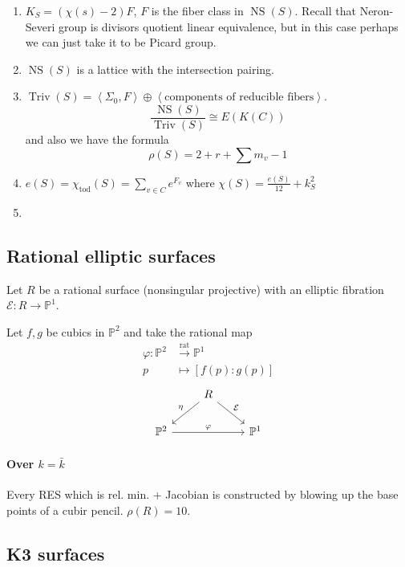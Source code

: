 \begin{enumerate}
	\item $K_S=(\chi(s)-2)F$,  $F$ is the fiber class in $\operatorname{NS}(S)$. Recall that Neron-Severi group is divisors quotient linear equivalence, but in this case perhaps we can just take it to be Picard group.
\item $\operatorname{NS}(S)$ is a lattice with the intersection pairing.
	\item $\operatorname{Triv}(S)=\left<\Sigma_0,F\right> \oplus \left<\text{components of reducible fibers} \right> $.
		\[\dfrac{\operatorname{NS}(S)}{\operatorname{Triv}(S)}\cong E(K(C))\]
		and also we have the formula
		\[\rho(S)=2+r+\sum m_v-1\]
	\item $e(S)=\chi_{\text{tod} }(S)=\sum_{v\in C}e^{F_v}$ where $\chi(S)=\frac{e(S)}{12}+k^2_S$
	\item 
\end{enumerate}

\subsection{Rational elliptic surfaces}

\begin{defn}
	Let $R$ be a rational surface (nonsingular projective) with an elliptic fibration $\mathcal{E}:R\to \mathbb{P}^1$.
\end{defn}

\begin{example}
	Let $f,g$ be cubics in  $\mathbb{P}^2$ and take the rational map
	\begin{align*}
		\varphi: \mathbb{P}^2 &\overset{\operatorname{rat}}{\longrightarrow} \mathbb{P}^1 \\
		p &\longmapsto [f(p):g(p)]
	\end{align*}
	\[\begin{tikzcd}
	&R\arrow[dl,"\eta",swap]\arrow[dr,"\mathcal{E}"]\\
	\mathbb{P}^2\arrow[rr,"\varphi"]&&\mathbb{P}^1
	\end{tikzcd}\]
\end{example}

\paragraph{Over $k=\bar{k}$} Every RES which is rel. min. + Jacobian is constructed by blowing up the base points of a cubir pencil. $\rho(R)=10$.

\subsection{K3 surfaces}

